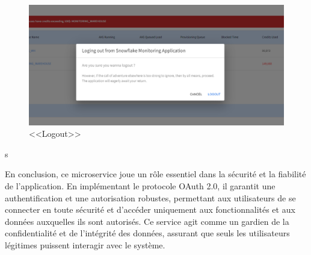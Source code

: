 \begin{itemize}
\begin{figure}[H]
                    \centering
                    \includegraphics[width =1\linewidth]{img/captures/auth/logout.png}
                    \caption{ <<Logout>>}
                        \label{fig:logout}
                    \end{figure}s
            \end{itemize}
\par En conclusion, ce microservice joue un rôle essentiel dans la sécurité et la fiabilité de l'application. En implémentant le protocole OAuth 2.0, il garantit une authentification et une autorisation robustes, permettant aux utilisateurs de se connecter en toute sécurité et d'accéder uniquement aux fonctionnalités et aux données auxquelles ils sont autorisés. Ce service agit comme un gardien de la confidentialité et de l'intégrité des données, assurant que seuls les utilisateurs légitimes puissent interagir avec le système. 
